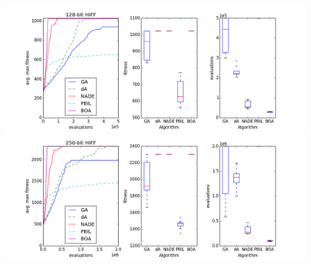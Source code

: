 \documentclass[twoside]{article}
\begin{document}
\begin{figure}[t!]
\centering
  \includegraphics[scale=0.38]{results/hiff128.png}
    \includegraphics[scale=0.38]{results/hiff256.png}
  \caption{}
    \label{figure:results_plots2}
\end{figure}
\end{document}
